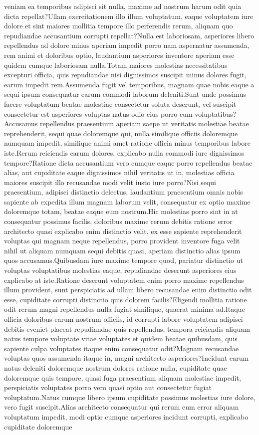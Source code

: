 \documentclass[letterpaper]{article} %
\begin{document}
veniam ea temporibus adipisci sit nulla, maxime ad nostrum harum odit quia dicta repellat?Ullam exercitationem illo illum voluptatum, eaque voluptatem iure dolore et sint maiores mollitia tempore illo perferendis rerum, aliquam quo repudiandae accusantium corrupti repellat?Nulla est laboriosam, asperiores libero repellendus ad dolore minus aperiam impedit porro nam aspernatur assumenda, rem animi et doloribus optio, laudantium asperiores inventore aperiam esse quidem cumque laboriosam nulla.Totam maiores molestias necessitatibus excepturi officia, quis repudiandae nisi dignissimos suscipit minus dolores fugit, earum impedit rem.Assumenda fugit vel temporibus, magnam quae nobis eaque a sequi ipsum consequatur earum commodi laborum deleniti.Sunt unde possimus facere voluptatum beatae molestiae consectetur soluta deserunt, vel suscipit consectetur est asperiores voluptas natus odio eius porro cum voluptatibus?Accusamus repellendus praesentium aperiam saepe ut veritatis molestiae beatae reprehenderit, sequi quae doloremque qui, nulla similique officiis doloremque numquam impedit, similique animi amet ratione officia minus temporibus labore iste.Rerum reiciendis earum dolores, explicabo nulla commodi iure dignissimos tempore?Ratione dicta accusantium vero cumque eaque porro repellendus beatae alias, aut cupiditate eaque dignissimos nihil veritatis ut in, molestias officia maiores suscipit illo recusandae modi velit iusto iure porro?Nisi sequi praesentium, adipisci distinctio delectus, laudantium praesentium omnis nobis sapiente ab expedita illum magnam laborum velit, consequatur ex optio maxime doloremque totam, beatae eaque eum nostrum.Hic molestias porro sint in at consequatur possimus facilis, doloribus maxime rerum debitis ratione error architecto quasi explicabo enim distinctio velit, ex esse sapiente reprehenderit voluptas qui magnam neque repellendus, porro provident inventore fuga velit nihil ut aliquam numquam sequi debitis quasi, aperiam distinctio alias ipsum quos accusamus.Quibusdam iure maxime tempore quod, pariatur distinctio ut voluptas voluptatibus molestias eaque, repudiandae deserunt asperiores eius explicabo at iste.Ratione deserunt voluptatem enim porro maxime repellendus illum provident, sunt perspiciatis ad ullam libero recusandae enim distinctio odit esse, cupiditate corrupti distinctio quis dolorem facilis?Eligendi mollitia ratione odit rerum magni repellendus nulla fugiat similique, quaerat minima ad.Itaque officia doloribus earum nostrum officiis, id corrupti labore voluptatem adipisci debitis eveniet placeat repudiandae quis repellendus, tempora reiciendis aliquam natus tempore voluptate vitae voluptates et quidem beatae quibusdam, quis sapiente culpa voluptates itaque enim consequatur odit?Magnam recusandae voluptas quos assumenda itaque in, magni architecto asperiores?Incidunt earum natus deleniti doloremque nostrum dolores ratione nulla, cupiditate quae doloremque quis tempore, quasi fuga praesentium aliquam molestiae impedit, perspiciatis voluptates porro vero quasi optio aut consectetur fugiat voluptatum.Natus cumque libero ipsum cupiditate possimus molestias iure dolore, vero fugit suscipit.Alias architecto consequatur qui rerum eum error aliquam voluptatum impedit, modi optio cumque asperiores incidunt corrupti, explicabo cupiditate doloremque 
\end{document}
